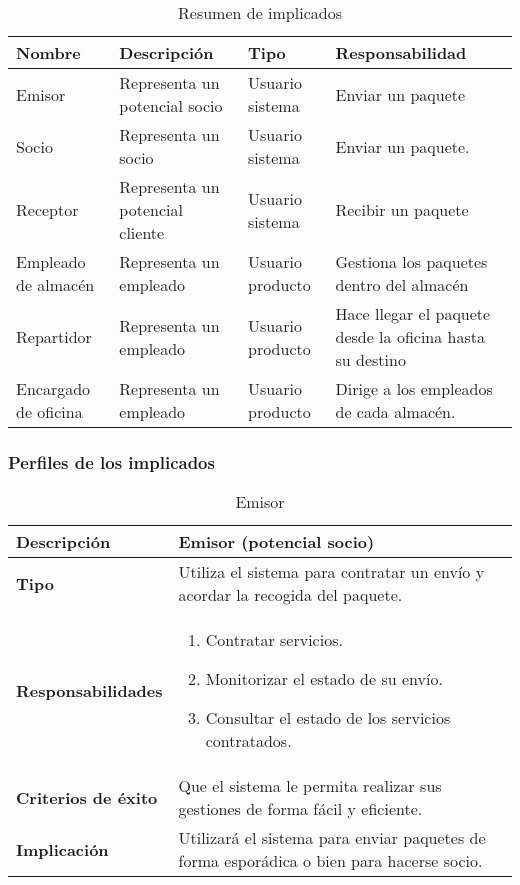 \documentclass[12pt,spanish]{article}
\begin{document}
\begin{table}[H]
\begin{center}
\begin{tabular}{|p{3cm}|p{4cm}|p{3cm}|p{4cm}|}
\hline
\textbf{Nombre} & \textbf{Descripción} & \textbf{Tipo} & \textbf{Responsabilidad} \\
\hline
Emisor & Representa un potencial socio & Usuario sistema & Enviar un paquete \\
\hline
Socio & Representa un socio & Usuario sistema & Enviar un paquete. \\
\hline
Receptor & Representa un potencial cliente & Usuario sistema & Recibir un paquete \\
\hline
Empleado de almacén & Representa un empleado & Usuario producto & Gestiona los paquetes dentro del almacén \\
\hline
Repartidor & Representa un empleado & Usuario producto & Hace llegar el paquete desde la oficina hasta su destino \\
\hline
Encargado de oficina & Representa un empleado & Usuario producto & Dirige a los empleados de cada almacén.  \\
\hline
\end{tabular}
\caption{Resumen de implicados}
\end{center}
\end{table}

\subsubsection{Perfiles de los implicados}
\begin{table}[H]
\begin{center}
\begin{tabular}{|l|m{11cm}|}
\hline
\textbf{Descripción} & Emisor (potencial socio) \\
\hline
\textbf{Tipo} & Utiliza el sistema para contratar un envío y acordar la recogida del paquete. \\
\hline
\textbf{Responsabilidades} & 
\begin{minipage}{11cm}
    \vskip 1pt
    \begin{enumerate}
   		\item Contratar servicios.
     	\item Monitorizar el estado de su envío.
  		\item Consultar el estado de los servicios contratados.
   \end{enumerate}
   \vskip 1pt
 \end{minipage}\\ 
\hline
\textbf{Criterios de éxito} & Que el sistema le permita realizar sus gestiones de forma fácil y eficiente.\\
\hline
\textbf{Implicación} & Utilizará el sistema para enviar paquetes de forma esporádica o bien para hacerse socio. \\
\hline
\end{tabular}
\caption{Emisor}
\end{center}
\end{table}
\end{document}

